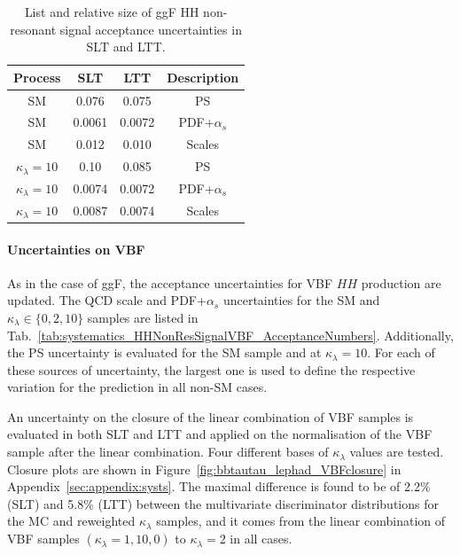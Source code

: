 \begin{table}
    \centering
    \small
    \begin{tabular}{|c|c|c|c|}
        \hline
        Process & SLT & LTT & Description\\
        \hline
        SM   &  0.076 & 0.075 & PS\\
        SM  &  0.0061 &  0.0072 & PDF+$\alpha_s$\\
        SM  &  0.012 &  0.010 & Scales \\
        $\kappa_\lambda=10$  &  0.10 &  0.085 & PS\\
        $\kappa_\lambda=10$  &  0.0074 &  0.0072 & PDF+$\alpha_s$\\
        $\kappa_\lambda=10$  &  0.0087 &  0.0074 & Scales \\
        \hline
    \end{tabular}
    \caption{List and relative size of ggF HH non-resonant signal 
    acceptance uncertainties in SLT and LTT.}
    \label{tab:systematics_HHNonResSignal_AcceptanceNumbers}
\end{table}

\paragraph{Uncertainties on VBF}

As in the case of ggF, the acceptance uncertainties for VBF $HH$ production are updated.
The QCD scale and PDF+$\alpha_s$ uncertainties for the SM and $\kappa_\lambda \in \{0, 2, 10\}$
samples are listed in Tab.~\ref{tab:systematics_HHNonResSignalVBF_AcceptanceNumbers}.
Additionally, the PS uncertainty is evaluated for the SM sample and at $\kappa_\lambda = 10$.
For each of these sources of uncertainty, the largest one is used to define the respective variation for the prediction in all non-SM cases.

An uncertainty on the closure of the linear combination of VBF samples is evaluated in both 
SLT and LTT and applied on the normalisation of the VBF sample after the linear combination. 
Four different bases of $\kappa_\lambda$ values are tested.
Closure plots are shown in Figure~\ref{fig:bbtautau_lephad_VBFclosure} in 
Appendix~\ref{sec:appendix:systs}. 
The maximal difference is found to be of 
2.2\% (SLT) and 5.8\% (LTT) 
between the multivariate discriminator distributions for the MC 
and reweighted $\kappa_\lambda$ samples, 
and it comes from the linear combination 
of VBF samples $(\kappa_\lambda = 1, 10, 0)$ to  $\kappa_\lambda=2$ in all cases.


